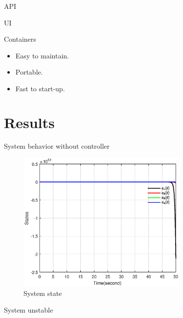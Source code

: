 \documentclass[dvipsnames,mathserif]{beamer}
\begin{document}
{    \begin{frame}

      \large API
      \vspace{0.25cm}

    \end{frame}


    \begin{frame}
      \large UI
      \vspace{0.25cm}
    \end{frame}


    \begin{frame}
      \large Containers
      \vspace{0.25cm}


      \begin{itemize}
        \item Easy to maintain.
        \item Portable.
        \item Fast to start-up.
      \end{itemize}


    \end{frame}

    \section{Results}

    \begin{frame}
      \footnotesize
      System behavior without controller
      \begin{figure}[H]
        \centering
        \includegraphics[width=0.75\textwidth]{x_1.eps}
        \caption{System state}
      \end{figure}
      System unstable
    \end{frame}

}
\end{document}

